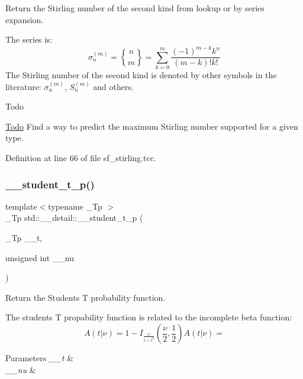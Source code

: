Return the Stirling number of the second kind from lookup or by series expansion.

The series is\+: \[ \sigma_n^{(m)} = \genfrac{\{}{\}}{0pt}{0}{n}{m} = \sum_{k=0}^{m}\frac{(-1)^{m-k}k^n}{(m-k)!k!} \] The Stirling number of the second kind is denoted by other symbols in the literature\+: $ \sigma_n^{(m)} $, $ \textit{S}_n^{(m)} $ and others.

\begin{DoxyRefDesc}{Todo}
\item[\hyperlink{todo__todo000011}{Todo}]Find a way to predict the maximum Stirling number supported for a given type. \end{DoxyRefDesc}


Definition at line 66 of file sf\+\_\+stirling.\+tcc.

\mbox{\label{namespacestd_1_1____detail_ab9bb02e26c61e3d9dda4738ed4174338}} 
\subsubsection{\texorpdfstring{\+\_\+\+\_\+student\+\_\+t\+\_\+p()}{\_\_student\_t\_p()}}
{\footnotesize\ttfamily template$<$typename \+\_\+\+Tp $>$ \\
\+\_\+\+Tp std\+::\+\_\+\+\_\+detail\+::\+\_\+\+\_\+student\+\_\+t\+\_\+p (\begin{DoxyParamCaption}\item[{\+\_\+\+Tp}]{\+\_\+\+\_\+t,  }\item[{unsigned int}]{\+\_\+\+\_\+nu }\end{DoxyParamCaption})}



Return the Students T probability function. 

The students T propability function is related to the incomplete beta function\+: \[ A(t|\nu) = 1 - I_{\frac{\nu}{\nu + t^2}}(\frac{\nu}{2}, \frac{1}{2}) A(t|\nu) = \]


\begin{DoxyParams}{Parameters}
{\em \+\_\+\+\_\+t} & \\
\hline
{\em \+\_\+\+\_\+nu} & \\
\hline
\end{DoxyParams}



